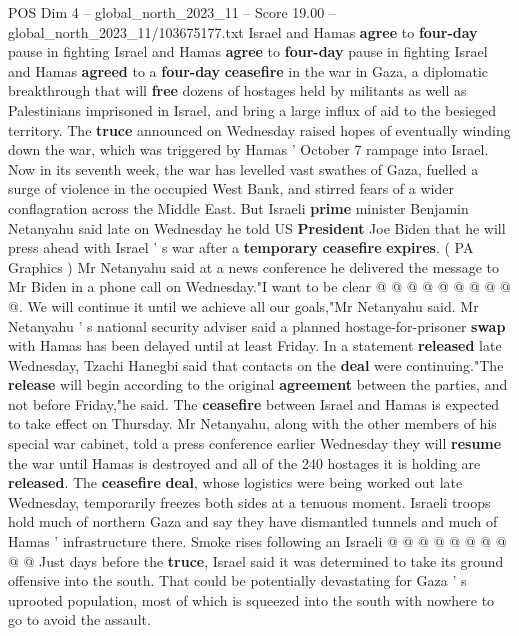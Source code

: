 \begin{textsample}{POS Dim 4 – global\_north\_2023\_11 – Score 19.00 – global\_north\_2023\_11/103675177.txt}  \label{ex:f4_pos_201}
Israel and Hamas \textbf{agree} to \textbf{four-day} pause in fighting Israel and Hamas \textbf{agree} to \textbf{four-day} pause in fighting Israel and Hamas \textbf{agreed} to a \textbf{four-day} \textbf{ceasefire} in the war in Gaza, a diplomatic breakthrough that will \textbf{free} dozens of hostages held by militants as well as Palestinians imprisoned in Israel, and bring a large influx of aid to the besieged territory.
The \textbf{truce} announced on Wednesday raised hopes of eventually winding down the war, which was triggered by Hamas ' October 7 rampage into Israel.
Now in its seventh week, the war has levelled vast swathes of Gaza, fuelled a surge of violence in the occupied West Bank, and stirred fears of a wider conflagration across the Middle East.
But Israeli \textbf{prime} minister Benjamin Netanyahu said late on Wednesday he told US \textbf{President} Joe Biden that he will press ahead with Israel ' s war after a \textbf{temporary} \textbf{ceasefire} \textbf{expires}. ( PA Graphics ) Mr Netanyahu said at a news conference he delivered the message to Mr Biden in a phone call on Wednesday."I want to be clear @ @ @ @ @ @ @ @ @ @.
We will continue it until we achieve all our goals,"Mr Netanyahu said.
Mr Netanyahu ' s national security adviser said a planned hostage-for-prisoner \textbf{swap} with Hamas has been delayed until at least Friday.
In a statement \textbf{released} late Wednesday, Tzachi Hanegbi said that contacts on the \textbf{deal} were continuing."The \textbf{release} will begin according to the original \textbf{agreement} between the parties, and not before Friday,"he said.
The \textbf{ceasefire} between Israel and Hamas is expected to take effect on Thursday.
Mr Netanyahu, along with the other members of his special war cabinet, told a press conference earlier Wednesday they will \textbf{resume} the war until Hamas is destroyed and all of the 240 hostages it is holding are \textbf{released}.
The \textbf{ceasefire} \textbf{deal}, whose logistics were being worked out late Wednesday, temporarily freezes both sides at a tenuous moment.
Israeli troops hold much of northern Gaza and say they have dismantled tunnels and much of Hamas ' infrastructure there.
Smoke rises following an Israeli @ @ @ @ @ @ @ @ @ @ Just days before the \textbf{truce}, Israel said it was determined to take its ground offensive into the south.
That could be potentially devastating for Gaza ' s uprooted population, most of which is squeezed into the south with nowhere to go to avoid the assault.

\end{textsample}
